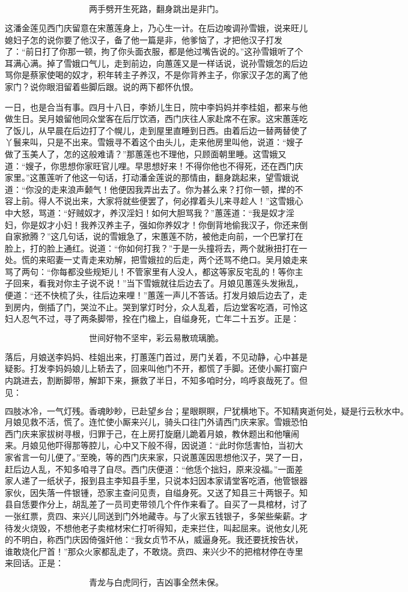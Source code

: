 \[
两手劈开生死路，翻身跳出是非门。
\]

这潘金莲见西门庆留意在宋蕙莲身上，乃心生一计。在后边唆调孙雪娥，说来旺儿媳妇子怎的说你要了他汉子，备了他一篇是非，他爹恼了，才把他汉子打发了：“前日打了你那一顿，拘了你头面衣服，都是他过嘴告说的。”这孙雪娥听了个耳满心满。掉了雪娥口气儿，走到前边，向蕙莲又是一样话说，说孙雪娥怎的后边骂你是蔡家使喝的奴才，积年转主子养汉，不是你背养主子，你家汉子怎的离了他家门？说你眼泪留着些脚后跟。说的两下都怀仇恨。

一日，也是合当有事。四月十八日，李娇儿生日，院中李妈妈并李桂姐，都来与他做生日。吴月娘留他同众堂客在后厅饮酒，西门庆往人家赴席不在家。这宋蕙莲吃了饭儿，从早晨在后边打了个幌儿，走到屋里直睡到日西。由着后边一替两替使了丫鬟来叫，只是不出来。雪娥寻不着这个由头儿，走来他房里叫他，说道：“嫂子做了玉美人了，怎的这般难请？”那蕙莲也不理他，只顾面朝里睡。这雪娥又道：“嫂子，你思想你家旺官儿哩。早思想好来！不得你他也不得死，还在西门庆家里。”这蕙莲听了他这一句话，打动潘金莲说的那情由，翻身跳起来，望雪娥说道：“你没的走来浪声颡气！他便因我弄出去了。你为甚么来？打你一顿，撵的不容上前。得人不说出来，大家将就些便罢了，何必撑着头儿来寻趁人！”这雪娥心中大怒，骂道：“好贼奴才，养汉淫妇！如何大胆骂我？”蕙莲道：“我是奴才淫妇，你是奴才小妇！我养汉养主子，强如你养奴才！你倒背地偷我汉子，你还来倒自家掀腾？”这几句话，说的雪娥急了，宋蕙莲不防，被他走向前，一个巴掌打在脸上，打的脸上通红。说道：“你如何打我？”于是一头撞将去，两个就揪扭打在一处。慌的来昭妻一丈青走来劝解，把雪娥拉的后走，两个还骂不绝口。吴月娘走来骂了两句：“你每都没些规矩儿！不管家里有人没人，都这等家反宅乱的！等你主子回来，看我对你主子说不说！”当下雪娥就往后边去了。月娘见蕙莲头发揪乱，便道：“还不快梳了头，往后边来哩！”蕙莲一声儿不答话。打发月娘后边去了，走到房内，倒插了门，哭泣不止。哭到掌灯时分，众人乱着，后边堂客吃酒，可怜这妇人忍气不过，寻了两条脚带，拴在门楹上，自缢身死，亡年二十五岁。正是：

\[
世间好物不坚牢，彩云易散琉璃脆。
\]

落后，月娘送李妈妈、桂姐出来，打蕙莲门首过，房门关着，不见动静，心中甚是疑影。打发李妈妈娘儿上轿去了，回来叫他门不开，都慌了手脚。还使小厮打窗户内跳进去，割断脚带，解卸下来，撅救了半日，不知多咱时分，呜呼哀哉死了。但见：

\[
四肢冰冷，一气灯残。香魂眇眇，已赴望乡台；星眼瞑瞑，尸犹横地下。不知精爽逝何处，疑是行云秋水中。
\]
月娘见救不活，慌了。连忙使小厮来兴儿，骑头口往门外请西门庆来家。雪娥恐怕西门庆来家拔树寻根，归罪于己，在上房打旋磨儿跪着月娘，教休题出和他嚷闹来。月娘见他吓得那等腔儿，心中又下般不得，因说道：“此时你恁害怕，当初大家省言一句儿便了。”至晚，等的西门庆来家，只说蕙莲因思想他汉子，哭了一日，赶后边人乱，不知多咱寻了自尽。西门庆便道：“他恁个拙妇，原来没福。”一面差家人递了一纸状子，报到县主李知县手里，只说本妇因本家请堂客吃酒，他管银器家伙，因失落一件银锺，恐家主查问见责，自缢身死。又送了知县三十两银子。知县自恁要作分上，胡乱差了一员司吏带领几个仵作来看了。自买了一具棺材，讨了一张红票，贲四、来兴儿同送到门外地藏寺。与了火家五钱银子，多架些柴薪。才待发火烧毁，不想他老子卖棺材宋仁打听得知，走来拦住，叫起屈来。说他女儿死的不明白，称西门庆因倚强奸他：“我女贞节不从，威逼身死。我还要抚按告状，谁敢烧化尸首！”那众火家都乱走了，不敢烧。贲四、来兴少不的把棺材停在寺里来回话。正是：

\[
青龙与白虎同行，吉凶事全然未保。
\]
